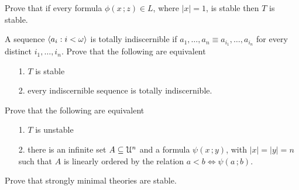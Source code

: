 \begin{exercise}
  Prove that if every formula $\phi(x\,;z)\in L$, where $|x|=1$, is stable then $T$ is stable.
\end{exercise}

\begin{exercise}
  A sequence $\langle a_i:i<\omega\rangle$ is totally indiscernible if $a_1,\dots,a_n\equiv a_{i_1},\dots,a_{i_n}$ for every distinct $i_1,\dots,i_n$.
  Prove that the following are equivalent
  \begin{itemize}
  \item[1.] $T$ is stable
  \item[2.] every indiscernible sequence is totally indiscernible.
  \end{itemize}
\end{exercise}

\begin{exercise}\label{ex_stable_orderproperty}
Prove that the following are equivalent
\begin{itemize}
\item[1.] $T$ is unstable
\item[2.] there is an infinite set $A\subseteq\EuScript U^n$ and a formula  $\psi(x\,;y)$, with $|x|=|y|=n$ such that $A$ is linearly ordered by the relation $a<b\iff\psi(a\,;b)$.
\end{itemize}
\end{exercise}

\begin{exercise}
Prove that strongly minimal theories are stable.
\end{exercise}

